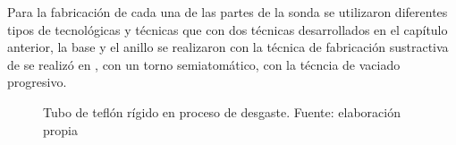 Para la fabricaci\'on de cada una de las partes de la sonda se utilizaron diferentes tipos de tecnológicas y t\'ecnicas que con dos t\'ecnicas desarrollados en el cap\'itulo anterior, la base y el anillo se realizaron con la t\'ecnica de fabricaci\'on sustractiva de   se realiz\'o en , con un torno semiatom\'atico, con la t\'ecncia de vaciado progresivo. 

        
\begin{figure}[ht]
\centering
{}
\caption{Tubo de tefl\'on r\'igido en proceso de desgaste. Fuente: elaboración propia}
\label{fig:preparacion}
\end{figure}
 
